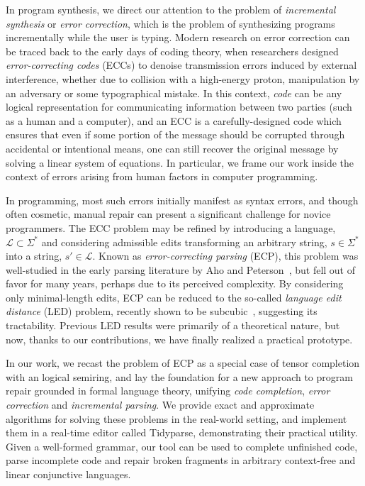 \documentclass[sigplan,review,anonymous,acmsmall]{acmart}\settopmatter{printfolios=false,printccs=false,printacmref=false}
\begin{document}
In program synthesis, we direct our attention to the problem of \textit{incremental synthesis} or \textit{error correction}, which is the problem of synthesizing programs incrementally while the user is typing. Modern research on error correction can be traced back to the early days of coding theory, when researchers designed \textit{error-correcting codes} (ECCs) to denoise transmission errors induced by external interference, whether due to collision with a high-energy proton, manipulation by an adversary or some typographical mistake. In this context, \textit{code} can be any logical representation for communicating information between two parties (such as a human and a computer), and an ECC is a carefully-designed code which ensures that even if some portion of the message should be corrupted through accidental or intentional means, one can still recover the original message by solving a linear system of equations. In particular, we frame our work inside the context of errors arising from human factors in computer programming.

In programming, most such errors initially manifest as syntax errors, and though often cosmetic, manual repair can present a significant challenge for novice programmers. The ECC problem may be refined by introducing a language, $\mathcal{L} \subset \Sigma^*$ and considering admissible edits transforming an arbitrary string, $s \in \Sigma^*$ into a string, $s'\in\mathcal{L}$. Known as \textit{error-correcting parsing} (ECP), this problem was well-studied in the early parsing literature by Aho and Peterson~\cite{aho1972minimum}, but fell out of favor for many years, perhaps due to its perceived complexity. By considering only minimal-length edits, ECP can be reduced to the so-called \textit{language edit distance} (LED) problem, recently shown to be subcubic~\cite{bringmann2019truly}, suggesting its tractability. Previous LED results were primarily of a theoretical nature, but now, thanks to our contributions, we have finally realized a practical prototype.

In our work, we recast the problem of ECP as a special case of tensor completion with an logical semiring, and lay the foundation for a new approach to program repair grounded in formal language theory, unifying \textit{code completion}, \textit{error correction} and \textit{incremental parsing}. We provide exact and approximate algorithms for solving these problems in the real-world setting, and implement them in a real-time editor called Tidyparse, demonstrating their practical utility. Given a well-formed grammar, our tool can be used to complete unfinished code, parse incomplete code and repair broken fragments in arbitrary context-free and linear conjunctive languages.
\end{document}
